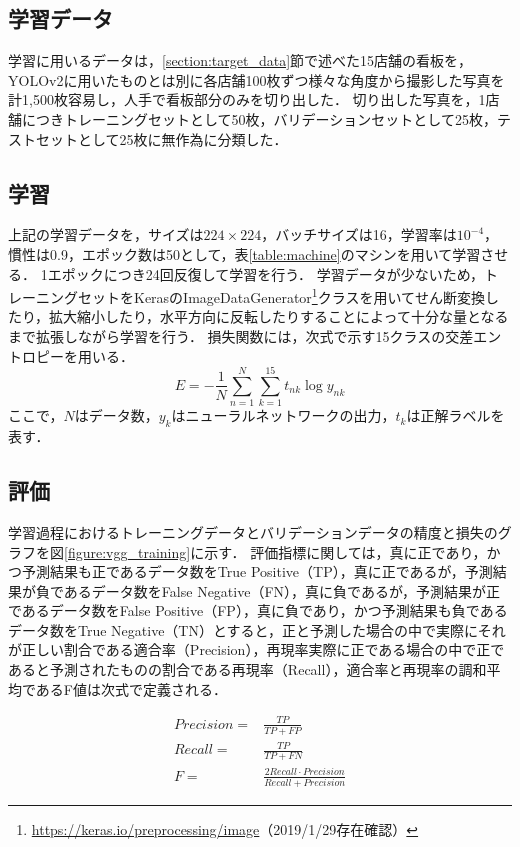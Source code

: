   \subsection{学習データ}
    学習に用いるデータは，\ref{section:target_data}節で述べた15店舗の看板を，YOLOv2に用いたものとは別に各店舗100枚ずつ様々な角度から撮影した写真を計1,500枚容易し，人手で看板部分のみを切り出した．
    切り出した写真を，1店舗につきトレーニングセットとして50枚，バリデーションセットとして25枚，テストセットとして25枚に無作為に分類した．
    
  \subsection{学習}
    上記の学習データを，サイズは$224 \times 224$，バッチサイズは16，学習率は$10^{-4}$，慣性は0.9，エポック数は50として，表\ref{table:machine}のマシンを用いて学習させる．
    1エポックにつき24回反復して学習を行う．
    学習データが少ないため，トレーニングセットをKerasのImageDataGenerator\footnote{\url{https://keras.io/preprocessing/image}（2019/1/29存在確認）}クラスを用いてせん断変換したり，拡大縮小したり，水平方向に反転したりすることによって十分な量となるまで拡張しながら学習を行う．
    損失関数には，次式で示す15クラスの交差エントロピーを用いる．
    \begin{equation}
      E = -\frac{1}{N} \sum_{n=1}^{N} \sum_{k=1}^{15} t_{nk} \log y_{nk}
    \end{equation}
    ここで，$N$はデータ数，$y_k$はニューラルネットワークの出力，$t_k$は正解ラベルを表す．

  \subsection{評価}
    学習過程におけるトレーニングデータとバリデーションデータの精度と損失のグラフを図\ref{figure:vgg_training}に示す．
    評価指標に関しては，真に正であり，かつ予測結果も正であるデータ数をTrue Positive（TP），真に正であるが，予測結果が負であるデータ数をFalse Negative（FN），真に負であるが，予測結果が正であるデータ数をFalse Positive（FP），真に負であり，かつ予測結果も負であるデータ数をTrue Negative（TN）とすると，正と予測した場合の中で実際にそれが正しい割合である適合率（Precision），再現率実際に正である場合の中で正であると予測されたものの割合である再現率（Recall），適合率と再現率の調和平均であるF値は次式で定義される\cite{Richert:2013}．

    \begin{align}
      Precision = &\frac{TP}{TP+FP} \\
      Recall = &\frac{TP}{TP+FN} \\
      F = &\frac{2 Recall \cdot Precision}{Recall + Precision}
    \end{align}
    
